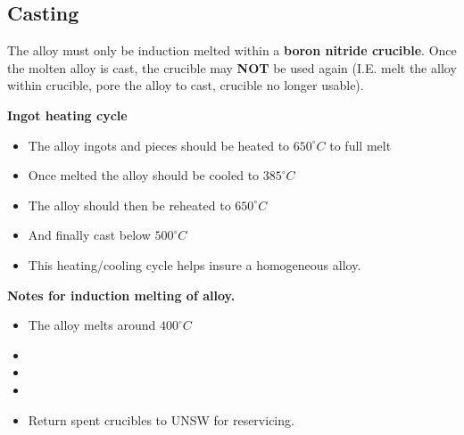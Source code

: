 \subsection{Casting}

The \MgZnCa alloy must only be induction melted within a \textbf{boron nitride crucible}. Once the molten alloy is cast, the crucible may \textbf{NOT} be used again (I.E. melt the alloy within crucible, pore the alloy to cast, crucible no longer usable). 

\textbf{Ingot heating cycle}
\begin{itemize}
\item The \MgZnCa alloy ingots and pieces should be heated to $650^{\circ}C$ to full melt
\item Once melted the alloy should be cooled to $385^{\circ}C$
\item The alloy should then be reheated to $650^{\circ}C$
\item And finally cast below $500^{\circ}C$
\item This heating/cooling cycle helps insure a homogeneous alloy.
\end{itemize}

\textbf{Notes for induction melting of \MgZnCa alloy.}
\begin{itemize}
\item The \MgZnCa alloy melts around $400^{\circ}C$
\item 
\item 
\item
\item Return spent crucibles to UNSW for reservicing. 
\end{itemize}